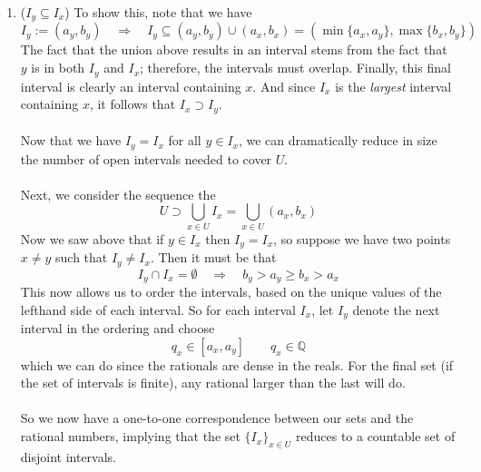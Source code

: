 \documentclass[12pt]{article}
\theoremstyle{plain}
\theoremstyle{definition}
\theoremstyle{remark}
\begin{document}
\begin{enumerate}
\begin{enumerate}
\end{enumerate}





\end{enumerate}

\begin{enumerate}
\item ($I_y\subseteq I_x$) To show this, note that we have
\[
    I_y := (a_y, b_y) \quad \Rightarrow \quad
    I_y\subseteq (a_y, b_y) \cup (a_x, b_x) 
    = (\min\{a_x,a_y\}, \max\{b_x, b_y\})
\]
The fact that the union above results in an interval stems from the fact that $y$ is in both $I_y$ and $I_x$; therefore, the intervals must overlap. Finally, this final interval is clearly an interval containing $x$. And since $I_x$ is the \emph{largest} interval containing $x$, it follows that $I_x\supset I_y$.
\\
\\
Now that we have $I_y = I_x$ for all $y\in I_x$, we can dramatically reduce in size the number of open intervals needed to cover $U$. 
\\
\\
Next, we consider the sequence the 
\[
    U\supset \bigcup_{x\in U} I_x 
    =\bigcup_{x\in U} (a_x, b_x)
\]
Now we saw above that if $y\in I_x$ then $I_y = I_x$, so suppose we have two points $x\neq y$ such that $I_y\neq I_x$. Then it must be that
\[
    I_y \cap I_x = \emptyset \quad \Rightarrow
    \quad b_y > a_y \geq b_x > a_x
\]
This now allows us to order the intervals, based on the unique values of the lefthand side of each interval. So for each interval $I_x$, let $I_y$ denote the next interval in the ordering and choose
\[
    q_x \in [a_x, a_y] \qquad q_x \in \mathbb{Q}
\]
which we can do since the rationals are dense in the reals. For the final set (if the set of intervals is finite), any rational larger than the last will do.
\\
\\
So we now have a one-to-one correspondence between our sets and the rational numbers, implying that the set $\{I_x\}_{x\in U}$ reduces to a countable set of disjoint intervals.



\end{enumerate}
\end{document}
